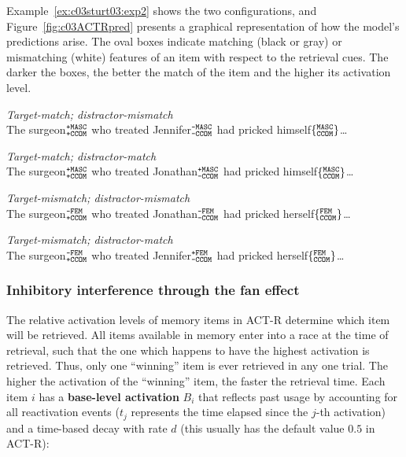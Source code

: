 \documentclass{cambridge7A}\usepackage[]{graphicx}\usepackage[]{color}
\newcommand{\featureset}[2]{$\{^{\texttt{\uppercase{#1}}}_{\texttt{\uppercase{#2}}}\}$}
\newcommand{\featuresetNP}[2]{$^{\texttt{\uppercase{#1}}}_{\texttt{\uppercase{#2}}}$}
\begin{document}
Example~\ref{ex:c03sturt03:exp2} shows the two configurations, and Figure~\ref{fig:c03ACTRpred} presents a graphical representation of how the model's predictions arise. The oval boxes indicate matching (black or gray) or mismatching (white) features of an item with respect to the retrieval cues. The darker the boxes, the better the match of the item and the higher its  activation level.

\begin{exe}
\ex\label{ex:c03sturt03:exp2}
\begin{xlist}
\item \textit{Target-match; distractor-mismatch}\\
The surgeon\featuresetNP{+MASC}{+CCOM} who treated Jennifer\featuresetNP{-MASC}{-CCOM} had pricked himself\featureset{MASC}{CCOM}\dots
\item \textit{Target-match; distractor-match}\\
The surgeon\featuresetNP{+MASC}{+CCOM} who treated Jonathan\featuresetNP{+MASC}{-CCOM} had pricked himself\featureset{MASC}{CCOM}\dots
\item \textit{Target-mismatch; distractor-mismatch}\\
The surgeon\featuresetNP{-FEM}{+CCOM} who treated Jonathan\featuresetNP{-FEM}{-CCOM} had pricked herself\featureset{FEM}{CCOM}\dots
\item \textit{Target-mismatch; distractor-match}\\
The surgeon\featuresetNP{-FEM}{+CCOM} who treated Jennifer\featuresetNP{+FEM}{-CCOM} had pricked herself\featureset{FEM}{CCOM}\dots
\end{xlist}
\end{exe}

\subsubsection{Inhibitory interference through the fan effect}

The relative activation levels of memory items in ACT-R determine which item will be retrieved. All items available in memory enter into a race at the time of retrieval, such that the one which happens to have the highest activation is retrieved. Thus, only one ``winning'' item is ever retrieved in any one trial. The higher the activation of the ``winning'' item, the faster the retrieval time.  Each item $i$ has a  \textbf{base-level activation} $B_i$  that reflects past usage by accounting for all reactivation events ($t_j$ represents the time elapsed since the $j$-th activation) and a time-based decay with rate $d$ (this usually has the default value $0.5$ in ACT-R):
\end{document}
